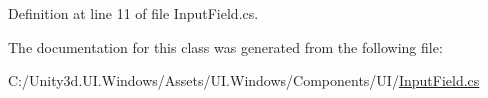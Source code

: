 Definition at line 11 of file Input\+Field.\+cs.



The documentation for this class was generated from the following file\+:\begin{DoxyCompactItemize}
\item 
C\+:/\+Unity3d.\+U\+I.\+Windows/\+Assets/\+U\+I.\+Windows/\+Components/\+U\+I/\hyperlink{_input_field_8cs}{Input\+Field.\+cs}\end{DoxyCompactItemize}
